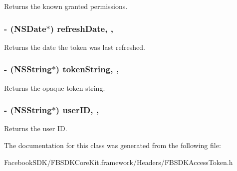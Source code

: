 Returns the known granted permissions. \hypertarget{interface_f_b_s_d_k_access_token_a97b06b3694130f8d29761fe98e19e94f}{
\subsubsection[{refresh\-Date}]{\setlength{\rightskip}{0pt plus 5cm}-\/ (N\-S\-Date$\ast$) refresh\-Date\hspace{0.3cm}{\ttfamily [read]}, {\ttfamily [nonatomic]}, {\ttfamily [copy]}}}\label{interface_f_b_s_d_k_access_token_a97b06b3694130f8d29761fe98e19e94f}
Returns the date the token was last refreshed. \hypertarget{interface_f_b_s_d_k_access_token_a03b123d10be809c697973673cd805b22}{
\subsubsection[{token\-String}]{\setlength{\rightskip}{0pt plus 5cm}-\/ (N\-S\-String$\ast$) token\-String\hspace{0.3cm}{\ttfamily [read]}, {\ttfamily [nonatomic]}, {\ttfamily [copy]}}}\label{interface_f_b_s_d_k_access_token_a03b123d10be809c697973673cd805b22}
Returns the opaque token string. \hypertarget{interface_f_b_s_d_k_access_token_ab8217b11468a826310a27ffe1e79ac7e}{
\subsubsection[{user\-I\-D}]{\setlength{\rightskip}{0pt plus 5cm}-\/ (N\-S\-String$\ast$) user\-I\-D\hspace{0.3cm}{\ttfamily [read]}, {\ttfamily [nonatomic]}, {\ttfamily [copy]}}}\label{interface_f_b_s_d_k_access_token_ab8217b11468a826310a27ffe1e79ac7e}
Returns the user I\-D. 

The documentation for this class was generated from the following file\-:\begin{DoxyCompactItemize}
\item 
Facebook\-S\-D\-K/\-F\-B\-S\-D\-K\-Core\-Kit.\-framework/\-Headers/F\-B\-S\-D\-K\-Access\-Token.\-h\end{DoxyCompactItemize}
